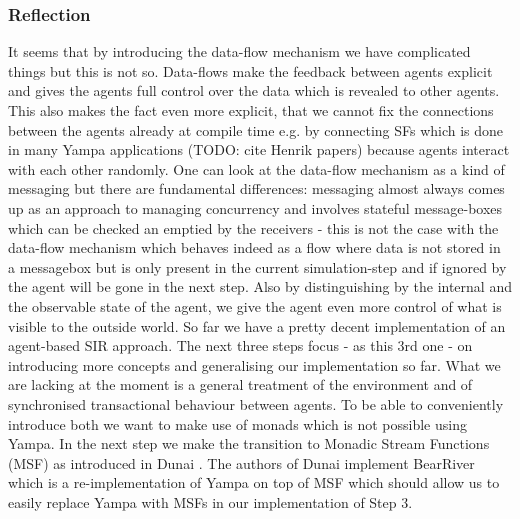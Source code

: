\subsubsection{Reflection}
It seems that by introducing the data-flow mechanism we have complicated things but this is not so. Data-flows make the feedback between agents explicit and gives the agents full control over the data which is revealed to other agents. This also makes the fact even more explicit, that we cannot fix the connections between the agents already at compile time e.g. by connecting SFs which is done in many Yampa applications (TODO: cite Henrik papers) because agents interact with each other randomly. One can look at the data-flow mechanism as a kind of messaging but there are fundamental differences: messaging almost always comes up as an approach to managing concurrency and involves stateful message-boxes which can be checked an emptied by the receivers - this is not the case with the data-flow mechanism which behaves indeed as a flow where data is not stored in a messagebox but is only present in the current simulation-step and if ignored by the agent will be gone in the next step.
Also by distinguishing by the internal and the observable state of the agent, we give the agent even more control of what is visible to the outside world.
So far we have a pretty decent implementation of an agent-based SIR approach. The next three steps focus - as this 3rd one - on introducing more concepts and generalising our implementation so far. What we are lacking at the moment is a general treatment of the environment and of synchronised transactional behaviour between agents. To be able to conveniently introduce both we want to make use of monads which is not possible using Yampa. In the next step we make the transition to Monadic Stream Functions (MSF) as introduced in Dunai \cite{perez_functional_2016}. The authors of Dunai implement BearRiver which is a re-implementation of Yampa on top of MSF which should allow us to easily replace Yampa with MSFs in our implementation of Step 3.